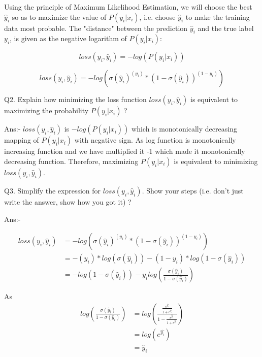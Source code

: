 \documentclass{article}
\begin{document}
\begin{flushleft}
Using the principle of Maximum Likelihood Estimation, we will choose the best $\hat{y}_i$ so as to maximize the value of $P(y_i | x_i)$, i.e. choose $\hat{y}_i$ to make the training data most probable. The "distance" between the prediction $\hat{y}_i$ and the true label $y_i$, is given as the negative logarithm of $P(y_i | x_i)$:

\begin{equation}
loss(y_i, \hat{y}_i) = -log(P(y_i | x_i))    
\end{equation}

\begin{equation}
loss(y_i, \hat{y}_i) = -log(\sigma(\hat{y}_i)^{(y_i)}*(1 - \sigma(\hat{y}_i))^{(1 - y_i)})  
\end{equation}

                  
Q2. Explain how minimizing the loss function $loss(y_i, \hat{y}_i)$ is equivalent to maximizing the probability $P(y_i | x_i)$ ?

Ans:- $loss(y_i, \hat{y}_i)$ is $-log(P(y_i | x_i))$ which is monotonically decreasing  mapping of $P(y_i | x_i)$ with negative sign. As log function is monotonically increasing function and we have multiplied it -1 which made it monotonically decreasing function. Therefore, maximizing $P(y_i | x_i)$ is equivalent to minimizing $loss(y_i, \hat{y}_i)$.

Q3. Simplify the expression for $loss(y_i, \hat{y}_i)$. Show your steps (i.e. don’t just write the answer, show how you got it) ?

Ans:- 

\begin{equation}
\begin{aligned}
loss(y_i, \hat{y}_i) &= -log(\sigma(\hat{y}_i)^{(y_i)} * (1 - \sigma(\hat{y}_i))^{(1 - y_i)})  \\
 &= -(y_i)*log(\sigma(\hat{y}_i)) -  (1 - y_i)*log(1-\sigma(\hat{y}_i)) \\
  &= -log(1-\sigma(\hat{y}_i))  -y_ilog(\frac{\sigma(\hat{y}_i)}{1-\sigma(\hat{y}_i)})
\end{aligned}                    
\end{equation}

As 
\begin{equation}
\begin{aligned}
log(\frac{\sigma(\hat{y}_i)}{1-\sigma(\hat{y}_i)}) 
&=  log(\frac{\frac{e^{\hat{y}_i}}{1+e^{\hat{y}_i}}}{1 - \frac{e^{\hat{y}_i}}{1+e^{\hat{y}_i}}}) \\
&= log(e^{\hat{y_i}}) \\
&= \hat{y}_i
\end{aligned}
\end{equation}


\end{flushleft}
\end{document}
